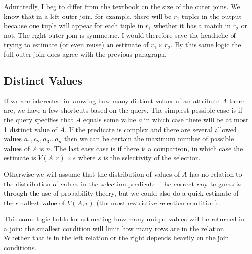 Admittedly, I beg to differ from the textbook on the size of the outer joins. We know that in a left outer join, for example, there will be $r_{1}$ tuples in the output because one tuple will appear for each tuple in $r_{1}$ whether it has a match in $r_{2}$ or not. The right outer join is symmetric. I would therefore save the headache of trying to estimate (or even reuse) an estimate of $r_{1} \bowtie r_{2}$. By this same logic the full outer join does agree with the previous paragraph.

\subsection*{Distinct Values}

If we are interested in knowing how many distinct values of an attribute $A$ there are, we have a few shortcuts based on the query. The simplest possible case is if the query specifies that $A$ equals some value $a$ in which case there will be at most 1 distinct value of $A$. If the predicate is complex and there are several allowed values $a_{1}, a_{2}, a_{3}... a_{n}$ then we can be certain the maximum number of possible values of $A$ is $n$. The last easy case is if there is a comparison, in which case the estimate is $V(A,r) \times s$ where $s$ is the selectivity of the selection.

Otherwise we will assume that the distribution of values of $A$ has no relation to the distribution of values in the selection predicate. The correct way to guess is through the use of probability theory, but we could also do a quick estimate of the smallest value of $V(A, r)$ (the most restrictive selection condition). 

This same logic holds for estimating how many unique values will be returned in a join: the smallest condition will limit how many rows are in the relation. Whether that is in the left relation or the right depends heavily on the join conditions. 





